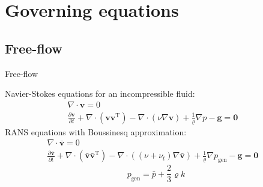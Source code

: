 \documentclass{beamer}
\begin{document}
\section{Governing equations}
\subsection*{Free-flow}
\begin{frame}{Free-flow}
Navier-Stokes equations for an incompressible fluid:
\begin{align*}
\nabla \cdot \mathbf{v} = 0&\\
\frac{\partial \mathbf{v}}{\partial t} + \nabla 
\cdot (\mathbf{v} \mathbf{v}^\mathrm{T}) - \nabla \cdot (\nu \nabla 
\mathbf{v}) + \frac{1}{\varrho}\nabla p  - \mathbf{g} = \mathbf{0}&
\end{align*}
RANS equations with Boussinesq approximation:
\begin{align*}
\nabla \cdot \bar{\mathbf{v}} = 0&\\
\frac{\partial \bar{\mathbf{v}}}{\partial t} + \nabla 
\cdot (\bar{\mathbf{v}} \bar{\mathbf{v}}^\mathrm{T}) - \nabla \cdot 
((\nu + \nu_t) \nabla \bar{\mathbf{v}}) + \frac{1}{\varrho}\nabla p_\text{gen} 
-\mathbf{g}= \mathbf{0}&
\end{align*}
\begin{equation*}
	p_\text{gen} = \bar{p}+\frac{2}{3}\varrho k
\end{equation*}
\end{frame}
\end{document}
